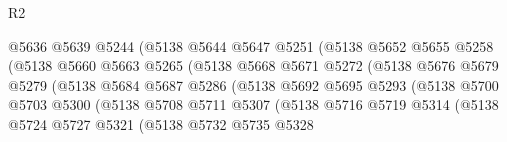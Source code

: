 \begin{lexlean}{R2}
\begin{coremodule}
                                  @5636
                                  @5639
                                  @5244
                                  (@5138
                                    @5644
                                    @5647
                                    @5251
                                    (@5138
                                      @5652
                                      @5655
                                      @5258
                                      (@5138
                                        @5660
                                        @5663
                                        @5265
                                        (@5138
                                          @5668
                                          @5671
                                          @5272
                                          (@5138
                                            @5676
                                            @5679
                                            @5279
                                            (@5138
                                              @5684
                                              @5687
                                              @5286
                                              (@5138
                                                @5692
                                                @5695
                                                @5293
                                                (@5138
                                                  @5700
                                                  @5703
                                                  @5300
                                                  (@5138
                                                    @5708
                                                    @5711
                                                    @5307
                                                    (@5138
                                                      @5716
                                                      @5719
                                                      @5314
                                                      (@5138
                                                        @5724
                                                        @5727
                                                        @5321
                                                        (@5138
                                                          @5732
                                                          @5735
                                                          @5328

\end{coremodule}
\end{lexlean}
